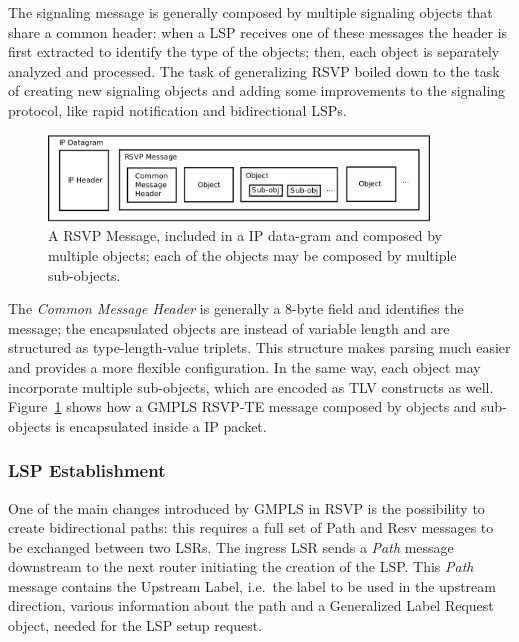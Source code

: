 \documentclass[10pt,a4paper]{report}
\begin{document}
The signaling message is generally composed by multiple signaling
objects that share a common header: when a LSP receives one of these
messages the header is first extracted to identify the type of the
objects; then, each object is separately analyzed and processed. The
task of generalizing RSVP boiled down to the task of creating new
signaling objects and adding some improvements to the signaling
protocol, like rapid notification and bidirectional LSPs.

\begin{figure}[!htbp]
  \centering
  \includegraphics[width=0.9\textwidth]{img/rsvp_message}
  \caption[RSVP message]{A RSVP Message, included in a IP data-gram
    and composed by multiple objects; each of the objects may be
    composed by multiple sub-objects.}
  \label{fig:rsvp_message}
\end{figure}

The \textit{Common Message Header} is generally a 8-byte field and
identifies the message; the encapsulated objects are instead of
variable length and are structured as type-length-value triplets. This
structure makes parsing much easier and provides a more flexible
configuration. In the same way, each object may incorporate multiple
sub-objects, which are encoded as TLV constructs as
well. Figure~\ref{fig:rsvp_message} shows how a GMPLS RSVP-TE message
composed by objects and sub-objects is encapsulated inside a IP
packet.

\subsubsection{LSP Establishment}
One of the main changes introduced by GMPLS in RSVP is the possibility
to create bidirectional paths: this requires a full set of Path and
Resv messages to be exchanged between two LSRs. The ingress LSR sends
a \textit{Path} message downstream to the next router initiating the
creation of the LSP\@. This \textit{Path} message contains the
Upstream Label, i.e.\ the label to be used in the upstream direction,
various information about the path and a Generalized Label Request
object, needed for the LSP setup request.
\end{document}
